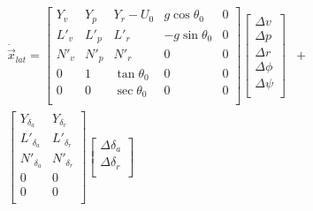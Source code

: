 \begin{align*}
    \dot{\vec{x}}_{lat} =
    \left[ \begin{array}{ *{5}{c} }
      Y_v & Y_p & Y_r - U_0 & g \cos \theta_0 & 0 \\
      L'_v & L'_p & L'_r & -g \sin \theta_0 & 0 \\
      N'_v & N'_p & N'_r & 0 & 0 \\
      0 & 1 & \tan \theta_0 & 0 & 0 \\
      0 & 0 & \sec \theta_0 & 0 & 0 \\
    \end{array} \right]
    \left[ \begin{array}{ *{1}{c} }
      \Delta v \\
      \Delta p \\
      \Delta r \\
      \Delta \phi \\
      \Delta \psi \\
    \end{array} \right] & + \\
    \left[ \begin{array}{ *{5}{c} }
      Y_{\delta_{a}} & Y_{\delta_{r}} \\
      L'_{\delta_{a}} & L'_{\delta_{r}} \\
      N'_{\delta_{a}} & N'_{\delta_{r}} \\
      0 & 0 \\
      0 & 0 \\
    \end{array} \right]
    \left[ \begin{array}{ *{1}{c} }
      \Delta \delta_a \\
      \Delta \delta_r \\
    \end{array} \right] & \\
\end{align*}
